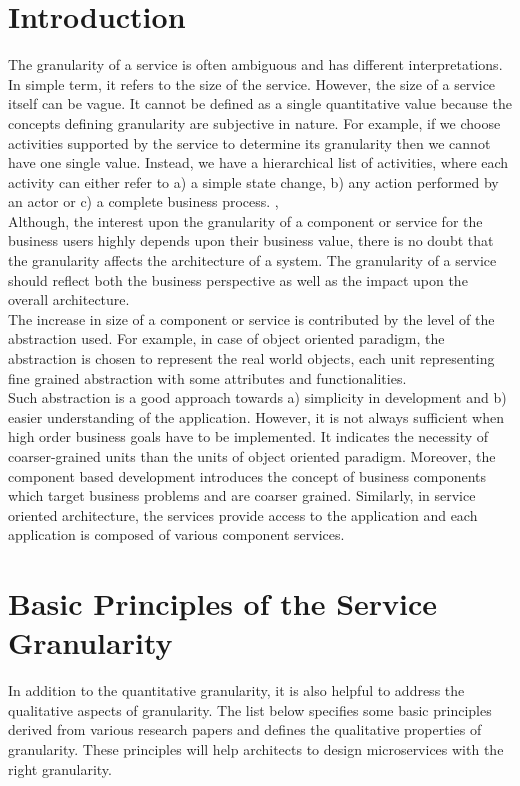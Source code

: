 \section{Introduction}\label{section:granularity/introduction}
The granularity of a service is often ambiguous and has different interpretations. In simple term, it refers to the size of the service. However, the size of a service itself can be vague. It cannot be defined as a single quantitative value because the concepts defining granularity are subjective in nature. For example, if we choose activities supported by the service to determine its granularity then we cannot have one single value. Instead, we have a hierarchical list of activities, where each activity can either refer to a) a simple state change, b) any action performed by an actor or c) a complete business process. \cite{Linthicum:2015aa}, \cite{Raf-Haesen:2015aa}
\\
Although, the interest upon the granularity of a component or service for the business users highly depends upon their business value, there is no doubt that the granularity affects the architecture of a system. The granularity of a service should reflect both the business perspective as well as the impact upon the overall architecture.
\\
The increase in size of a component or service is contributed by the level of the abstraction used. For example, in case of object oriented paradigm, the abstraction is chosen to represent the real world objects, each unit representing fine grained abstraction with some attributes and functionalities.
\\
Such abstraction is a good approach towards a) simplicity in development and b) easier understanding of the application. However, it is not always sufficient when high order business goals have to be implemented. It indicates the necessity of coarser-grained units than the units of object oriented paradigm. Moreover, the component based development introduces the concept of business components which target business problems and are coarser grained. Similarly, in service oriented architecture, the services provide access to the application and each application is composed of various component services. \cite{Linthicum:2015aa}

\section{Basic Principles of the Service Granularity}\label{section:granularity/principles}
In addition to the quantitative granularity, it is also helpful to address the qualitative aspects of granularity. The list below specifies some basic principles derived from various research papers and defines the qualitative properties of granularity. These principles will help architects to design microservices with the right granularity.

